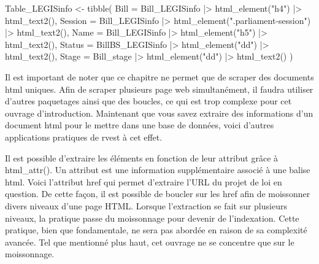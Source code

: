 \documentclass[
  letterpaper,
  DIV=11,
  numbers=noendperiod]{scrreprt}
\newenvironment{Shaded}{\begin{snugshade}}{\end{snugshade}}
\newcommand{\ErrorTok}[1]{\textcolor[rgb]{0.68,0.00,0.00}{#1}}
\newcommand{\ExtensionTok}[1]{\textcolor[rgb]{0.00,0.23,0.31}{#1}}
\newcommand{\FunctionTok}[1]{\textcolor[rgb]{0.28,0.35,0.67}{#1}}
\newcommand{\KeywordTok}[1]{\textcolor[rgb]{0.00,0.23,0.31}{#1}}
\newcommand{\NormalTok}[1]{\textcolor[rgb]{0.00,0.23,0.31}{#1}}
\newcommand{\OperatorTok}[1]{\textcolor[rgb]{0.37,0.37,0.37}{#1}}
\newcommand{\StringTok}[1]{\textcolor[rgb]{0.13,0.47,0.30}{#1}}
\begin{document}
\begin{Shaded}
\begin{Highlighting}[]
\ExtensionTok{Table\_LEGISinfo} \OperatorTok{\textless{}}\NormalTok{{-} tibble}\ErrorTok{(}
  \ExtensionTok{Bill}\NormalTok{ = Bill\_LEGISinfo }\KeywordTok{|}\OperatorTok{\textgreater{}}\NormalTok{ html\_element}\KeywordTok{(}\StringTok{"h4"}\KeywordTok{)} \KeywordTok{|}\OperatorTok{\textgreater{}}\NormalTok{ html\_text2}\KeywordTok{()}\ExtensionTok{,}
  \ExtensionTok{Session}\NormalTok{ = Bill\_LEGISinfo }\KeywordTok{|}\OperatorTok{\textgreater{}}\NormalTok{ html\_element}\KeywordTok{(}\StringTok{".parliament{-}session"}\KeywordTok{)} \KeywordTok{|}\OperatorTok{\textgreater{}}
  \FunctionTok{html\_text2()}\ExtensionTok{,}
  \ExtensionTok{Name}\NormalTok{ = Bill\_LEGISinfo }\KeywordTok{|}\OperatorTok{\textgreater{}}\NormalTok{ html\_element}\KeywordTok{(}\StringTok{"h5"}\KeywordTok{)} \KeywordTok{|}\OperatorTok{\textgreater{}}\NormalTok{ html\_text2}\KeywordTok{()}\ExtensionTok{,}
  \ExtensionTok{Status}\NormalTok{ = BillBS\_LEGISinfo }\KeywordTok{|}\OperatorTok{\textgreater{}}\NormalTok{ html\_element}\KeywordTok{(}\StringTok{"dd"}\KeywordTok{)} \KeywordTok{|}\OperatorTok{\textgreater{}}\NormalTok{ html\_text2}\KeywordTok{()}\ExtensionTok{,}
  \ExtensionTok{Stage}\NormalTok{ = Bill\_stage }\KeywordTok{|}\OperatorTok{\textgreater{}}\NormalTok{ html\_element}\KeywordTok{(}\StringTok{"dd"}\KeywordTok{)} \KeywordTok{|}\OperatorTok{\textgreater{}}\NormalTok{ html\_text2}\KeywordTok{()}
\KeywordTok{)}
\end{Highlighting}
\end{Shaded}

Il est important de noter que ce chapitre ne permet que de scraper des
documents html uniques. Afin de scraper plusieurs page web
simultanément, il faudra utiliser d'autres paquetages ainsi que des
boucles, ce qui est trop complexe pour cet ouvrage d'introduction.
Maintenant que vous savez extraire des informations d'un document html
pour le mettre dans une base de données, voici d'autres applications
pratiques de rvest à cet effet.

Il est possible d'extraire les éléments en fonction de leur attribut
grâce à html\_attr(). Un attribut est une information supplémentaire
associé à une balise html. Voici l'attribut href qui permet d'extraire
l'URL du projet de loi en question. De cette façon, il est possible de
boucler sur les href afin de moissonner divers niveaux d'une page HTML.
Lorsque l'extraction se fait sur plusieurs niveaux, la pratique passe du
moissonnage pour devenir de l'indexation. Cette pratique, bien que
fondamentale, ne sera pas abordée en raison de sa complexité avancée.
Tel que mentionné plus haut, cet ouvrage ne se concentre que sur le
moissonnage.
\end{document}
